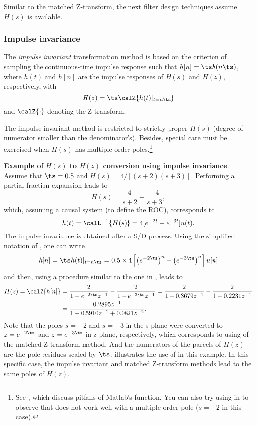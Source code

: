 Similar to the matched Z-transform, the next filter design techniques assume $H(s)$ is available.

\subsubsection{Impulse invariance}

The \emph{impulse invariant} transformation method is based on
the criterion of sampling the continuous-time impulse response such that $h[n] = \ts h(n \ts)$, where $h(t)$ and $h[n]$ are the impulse responses
 of $H(s)$ and $H(z)$, respectively, with
\begin{equation}
H(z) = \ts \calZ \{ h(t)|_{t=n\ts}\}
\label{eq:impulseInvariant}
\end{equation}
and $\calZ \{ \cdot \}$ denoting the Z-transform. 

The impulse invariant method is restricted to strictly proper $H(s)$ (degree of numerator smaller than the denominator's). Besides, special care must be exercised when $H(s)$ has multiple-order poles.\footnote{See \cite{Cavicchi96,Nelatury07}, which discuss pitfalls of Matlab's  function.
You can also try using  in  to
observe that  does not work well with a multiple-order pole ($s=-2$ in this case).
}

\bExample \textbf{Example of $H(s)$ to $H(z)$ conversion using impulse invariance}.
Assume that $\ts=0.5$ and $H(s) = 4/[(s+2)(s+3)]$. Performing a partial fraction expansion leads to
\[
H(s) = \frac{4}{s+2} + \frac{-4}{s+3},
\]
which, assuming a causal system (to define the ROC), corresponds to 
\[
h(t) = \calL^{-1} \{ H(s) \} = 4[ e^{-2t}  -  e^{-3t}] u(t).
\]
The impulse invariance is obtained after a S/D process. Using the simplified
notation of , one can write
\[
h[n] = \ts h(t)|_{t=n \ts}  = 0.5 \times 4 \left[\left(e^{-2\ts}\right)^n  - \left(e^{-3 \ts} \right)^n \right] u[n] 
\]
and then, using a procedure similar to the one in , leads to
\begin{align}
H(z) = \calZ \{ h[n] \} &= \frac{2}{1 - e^{-2\ts} z^{-1}} - \frac{2}{1 - e^{-3\ts} z^{-1}} =
\frac{2}{1 - 0.3679 z^{-1}} - \frac{2}{1 - 0.2231 z^{-1}} \nonumber \\
&= \frac{0.2895 z^{-1}}{1 - 0.5910 z^{-1} + 0.0821 z^{-2}}.
\end{align}
Note that the poles $s=-2$ and $s=-3$ in the s-plane were converted to
$z=e^{-2\ts}$ and $z=e^{-3\ts}$ in z-plane, respectively, which corresponds to using
 of the matched Z-transform method. And the numerators of the parcels
of $H(z)$ are the pole residues scaled by $\ts$.
 illustrates the use of  in this example.
In this specific case, the impulse invariant and matched Z-transform methods lead
to the same poles of $H(z)$.

